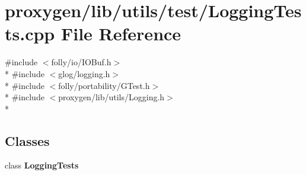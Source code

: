 \section{proxygen/lib/utils/test/\+Logging\+Tests.cpp File Reference}
\label{utils_2test_2LoggingTests_8cpp}
{\ttfamily \#include $<$folly/io/\+I\+O\+Buf.\+h$>$}\\*
{\ttfamily \#include $<$glog/logging.\+h$>$}\\*
{\ttfamily \#include $<$folly/portability/\+G\+Test.\+h$>$}\\*
{\ttfamily \#include $<$proxygen/lib/utils/\+Logging.\+h$>$}\\*
\subsection*{Classes}
\begin{DoxyCompactItemize}
\item 
class {\bf Logging\+Tests}
\end{DoxyCompactItemize}
